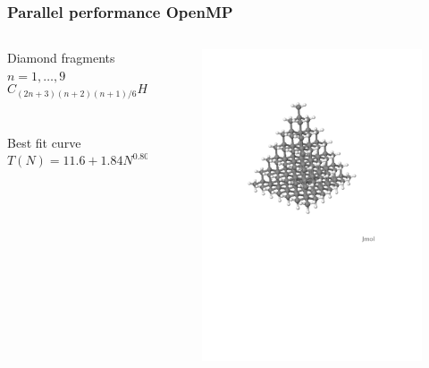 \documentclass[mathserif]{beamer}
\begin{document}
\begin{frame}
    \frametitle{Parallel performance OpenMP}
    \begin{columns}
    \begin{column}{.50\textwidth}
    Diamond fragments $n=1,\dots,9$
    \begin{equation}
	\nonumber
	C_{(2n+3)(n+2)(n+1)/6}H_{2(n+2)(n+1)}
    \end{equation}
    \ \\
    \ \\
    Best fit curve
    \begin{equation}
	\nonumber
	T(N) = 11.6 + 1.84N^{0.805} \qquad\qquad\qquad\qquad\qquad\qquad\qquad\qquad
    \end{equation}
    \end{column}
    \begin{column}{.50\textwidth}
	\begin{figure}
	    \includegraphics[scale=0.25, clip, viewport = 10 390 500 720]{figures/diamond.pdf}

\end{figure}
\end{column}
\end{columns}
\end{frame}
\end{document}

